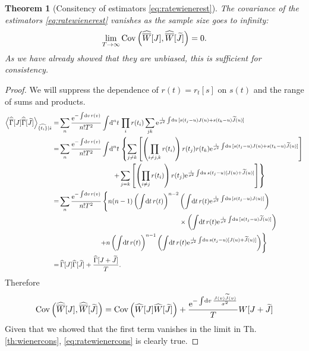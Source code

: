 \documentclass[12pt]{article}
\theoremstyle{slplain}
\newtheorem{thm}{Theorem}
\theoremstyle{sldefinition}
\theoremstyle{remark}
\newcommand{\tj}{\widetilde{J}}
\newcommand{\hz}{\widehat{\Gamma}}
\newcommand{\hhz}{\widehat{\overline{\Gamma}}}
\newcommand{\hw}{\widehat{W}}
\newcommand{\hhw}{\widehat{\overline{W}}}
\begin{document}
\begin{thm}[Consitency of estimators \eqref{eq:ratewienerest}]
  The covariance of the estimators \eqref{eq:ratewienerest} vanishes as the sample size goes to infinity:
  \begin{equation}\label{eq:ratewienercons}
    \lim_{T\to\infty} \cov\prn{ \hhw[J], \hhw[\tj] } = 0.
  \end{equation}
  As we have already showed that they are unbiased, this is sufficient for consistency.
\end{thm}
\begin{proof}
  We will suppress the dependence of $r(t)=r_t[s]$ on $s(t)$ and the range of sums and products.
  \begin{equation*}
    \begin{aligned}
      \av{\hhz[J]\hhz[\tj]}_{\widehat{\{t_i\}}|\hat{s}} =& \sum_n \frac{\e^{-\intd{v}r(v)}}{n!T^2} \intd{^nt} \prod_ir(t_i) \sum_{jk} \e^{\frac{\ir}{\sigma^2}\intd{u}[s(t_j-u)J(u)+s(t_k-u)\tj(u)]} \\
        =& \sum_n \frac{\e^{-\intd{v}r(v)}}{n!T^2} \intd{^nt} \left\{
         \sum_{j\neq k} \brk{\prn{\prod_{i\neq j,k} r(t_i)} r(t_j) r(t_k) \e^{\frac{\ir}{\sigma^2}\intd{u}[s(t_j-u)J(u)+s(t_k-u)\tj(u)]}}
        \right. \\&\left. \qquad\qquad\qquad\qquad
         + \sum_{j=k} \brk{\prn{\prod_{i\neq j} r(t_i)} r(t_j) \e^{\frac{\ir}{\sigma^2}\intd{u}s(t_j-u)[J(u)+\tj(u)]}}
        \right\} \\
      =& \sum_n \frac{\e^{-\intd{v}r(v)}}{n!T^2} \left\{
         n(n-1) \prn{\intd{t} r(t)}^{n-2} \prn{\intd{t} r(t) \e^{\frac{\ir}{\sigma^2}\intd{u}[s(t_j-u)J(u)]}}
         \right.\\& \qquad\qquad\qquad\qquad\qquad\qquad\qquad\qquad\qquad
         \times \prn{\intd{t} r(t) \e^{\frac{\ir}{\sigma^2}\intd{u}[s(t_j-u)\tj(u)]}}
         \\&
         \left. \qquad\qquad\qquad
         +  n \prn{\intd{t} r(t)}^{n-1} \prn{\intd{t} r(t) \e^{\frac{\ir}{\sigma^2}\intd{u}s(t_j-u)[J(u)+\tj(u)]}} 
        \right\} \\
        =& \,\hz[J]\hz[\tj] + \frac{\hz[J+\tj]}{T}.
    \end{aligned}
  \end{equation*}
  Therefore
  \begin{equation*}
    \cov\prn{\hhw[J],\hhw[\tj]} = \cov\prn{\hw[J]\hw[\tj]} + \frac{\e^{-\intd{v}\frac{J(v)\tj(v)}{\sigma^2}}}{T}W[J+\tj]
  \end{equation*}
  Given that we showed that the first term vanishes in the limit in Th.\ref{th:wienercons}, \eqref{eq:ratewienercons} is clearly true.
\end{proof}
\end{document}
